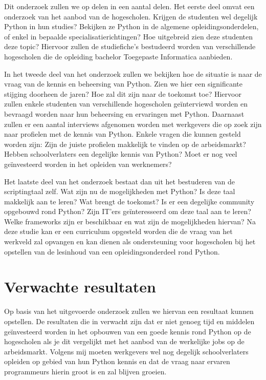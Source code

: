 Dit onderzoek zullen we op delen in een aantal delen. Het eerste deel omvat een onderzoek van het aanbod van de hogescholen. Krijgen de studenten wel degelijk Python in hun studies? Bekijken ze Python in de algemene opleidingsonderdelen, of enkel in bepaalde specialisatierichtingen? Hoe uitgebreid zien deze studenten deze topic? Hiervoor zullen de studiefiche's bestudeerd worden van verschillende hogescholen die de opleiding bachelor Toegepaste Informatica aanbieden. 

In het tweede deel van het onderzoek zullen we bekijken hoe de situatie is naar de vraag van de kennis en beheersing van Python. Zien we hier een significante stijging doorheen de jaren? Hoe zal dit zijn naar de toekomst toe? Hiervoor zullen enkele studenten van verschillende hogescholen geïnterviewd worden en bevraagd worden naar hun beheersing en ervaringen met Python. Daarnaast zullen er een aantal interviews afgenomen worden met werkgevers die op zoek zijn naar profielen met de kennis van Python. Enkele vragen die kunnen gesteld worden zijn: Zijn de juiste profielen makkelijk te vinden op de arbeidsmarkt? Hebben schoolverlaters een degelijke kennis van Python? Moet er nog veel geïnvesteerd worden in het opleiden van werknemers?

Het laatste deel van het onderzoek bestaat dan uit het bestuderen van de scriptingtaal zelf. Wat zijn nu de mogelijkheden met Python? Is deze taal makkelijk aan te leren? Wat brengt de toekomst? Is er een degelijke community opgebouwd rond Python?  Zijn IT’ers geïnteresseerd om deze taal aan te leren? Welke frameworks zijn er beschikbaar en wat zijn de mogelijkheden hiervan? Na deze studie kan er een curriculum opgesteld worden die de vraag van het werkveld zal opvangen en kan dienen als ondersteuning voor hogescholen bij het opstellen van de lesinhoud van een opleidingsonderdeel rond Python.


\section{Verwachte resultaten}
\label{sec:verwachte_resultaten}

Op basis van het uitgevoerde onderzoek zullen we hiervan een resultaat kunnen opstellen. De resultaten die in verwacht zijn dat er niet genoeg tijd en middelen geïnvesteerd worden in het opbouwen van een goede kennis rond Python op de hogescholen als je dit vergelijkt met het aanbod van de werkelijke jobs op de arbeidsmarkt. Volgens mij moeten werkgevers wel nog degelijk schoolverlaters opleiden op gebied van hun Python kennis en dat de vraag naar ervaren programmeurs hierin groot is en zal blijven groeien.

